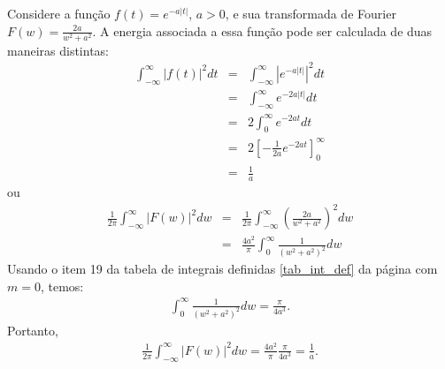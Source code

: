 \begin{ex}Considere a função $f(t)=e^{-a|t|}$, $a>0$, e sua transformada de Fourier $F(w)=\frac{2a}{w^2+a^2}$. A energia associada a essa função pode ser calculada de duas maneiras distintas:
\begin{eqnarray*}
\int_{-\infty}^\infty |f(t)|^2dt&=&\int_{-\infty}^\infty |e^{-a|t|}|^2dt\\
&=&\int_{-\infty}^\infty e^{-2a|t|}dt\\
&=&2\int_{0}^\infty e^{-2a t}dt\\
&=&2\left[-\frac{1}{2a} e^{-2a t}\right]_{0}^\infty\\
&=&\frac{1}{a}
\end{eqnarray*}
ou
\begin{eqnarray*}
\frac{1}{2\pi}\int_{-\infty}^\infty |F(w)|^2dw&=&\frac{1}{2\pi}\int_{-\infty}^\infty \left(\frac{2a}{w^2+a^2}\right)^2dw\\
&=&\frac{4a^2}{\pi}\int_{0}^\infty \frac{1}{\left(w^2+a^2\right)^2}dw
\end{eqnarray*}
Usando o item 19 da tabela de integrais definidas \ref{tab_int_def} da página \pageref{tab_int_def} com $m=0$, temos:
\begin{eqnarray*}
\int_{0}^\infty \frac{1}{\left(w^2+a^2\right)^2}dw=\frac{\pi}{4a^3}.
\end{eqnarray*}
Portanto,
\begin{eqnarray*}
\frac{1}{2\pi}\int_{-\infty}^\infty |F(w)|^2dw=\frac{4a^2}{\pi}\frac{\pi}{4a^3}=\frac{1}{a}.
\end{eqnarray*}
\end{ex}


